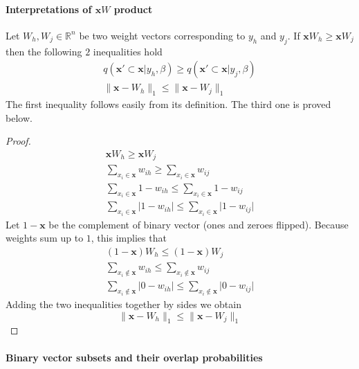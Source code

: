 \documentclass[12pt]{article}
\begin{document}
\paragraph{Interpretations of  $\boldsymbol{x}W$ product}
Let $W_h,W_j \in \mathbb{R}^n$ be two weight vectors corresponding to $y_h$ and $y_j$. If $\boldsymbol{x}W_h \ge \boldsymbol{x}W_j$ then the following $2$ inequalities hold
\begin{gather*}
q(\boldsymbol{x}' \subset \boldsymbol{x} |y_h,\beta) \ge q(\boldsymbol{x}' \subset \boldsymbol{x} |y_j,\beta) \\
\lVert \boldsymbol{x} - W_h \rVert_1 \le \lVert  \boldsymbol{x} - W_j \rVert_1
\end{gather*}
The first inequality follows easily from its definition. The third one is proved below.
\begin{proof}
	\begin{gather*}
		\boldsymbol{x} W_h \ge \boldsymbol{x} W_j \\
		\sum_{x_i\in\boldsymbol{x} }w_{ih} \ge \sum_{x_i\in\boldsymbol{x} }w_{ij} \\
		\sum_{x_i\in\boldsymbol{x} }1-w_{ih} \le \sum_{x_i\in\boldsymbol{x} }1-w_{ij} \\
		\sum_{x_i\in\boldsymbol{x} }\vert 1-w_{ih}\vert \le \sum_{x_i\in\boldsymbol{x} }\vert 1-w_{ij}\vert
	\end{gather*}
	Let $1-\boldsymbol{x}$ be the complement of binary vector (ones and zeroes flipped). Because weights sum up to $1$, this implies that
	\begin{gather*}
		(1-\boldsymbol{x}) W_h \le (1-\boldsymbol{x}) W_j \\
		\sum_{x_i\notin\boldsymbol{x} }w_{ih} \le \sum_{x_i\notin\boldsymbol{x} }w_{ij} \\
		\sum_{x_i\notin\boldsymbol{x} }\vert 0-w_{ih}\vert \le \sum_{x_i\notin\boldsymbol{x} }\vert 0-w_{ij}\vert
	\end{gather*}
	Adding the two inequalities together by sides we obtain
	\[
	\lVert \boldsymbol{x} - W_h \rVert_1 \le \lVert  \boldsymbol{x} - W_j \rVert_1
	\]
\end{proof}

\paragraph{Binary vector subsets and their overlap probabilities} 
\end{document}
